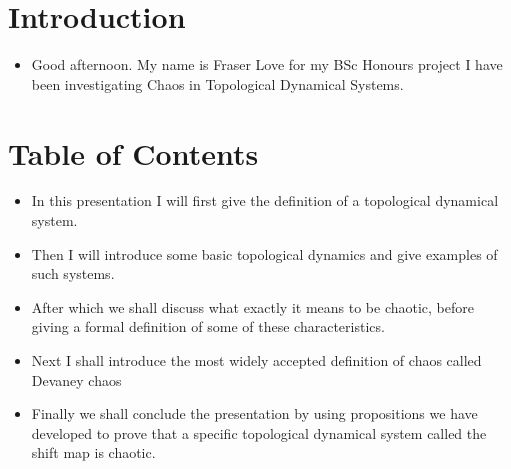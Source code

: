 \documentclass{article}
\begin{document}
    \setcounter{section}{0}
    \section{Introduction}
    \begin{itemize}
        \item Good afternoon. My name is Fraser Love for my BSc Honours project I have been investigating Chaos in Topological Dynamical Systems.
    \end{itemize}

    \section{Table of Contents}
    \begin{itemize}
        \item In this presentation I will first give the definition of a topological dynamical system.
        \item Then I will introduce some basic topological dynamics and give examples of such systems.
        \item After which we shall discuss what exactly it means to be chaotic, before giving a formal definition of some of these characteristics.
        \item Next I shall introduce the most widely accepted definition of chaos called Devaney chaos
        \item Finally we shall conclude the presentation by using propositions we have developed to prove that a specific topological dynamical system called the shift map is chaotic.
    \end{itemize}
\end{document}
